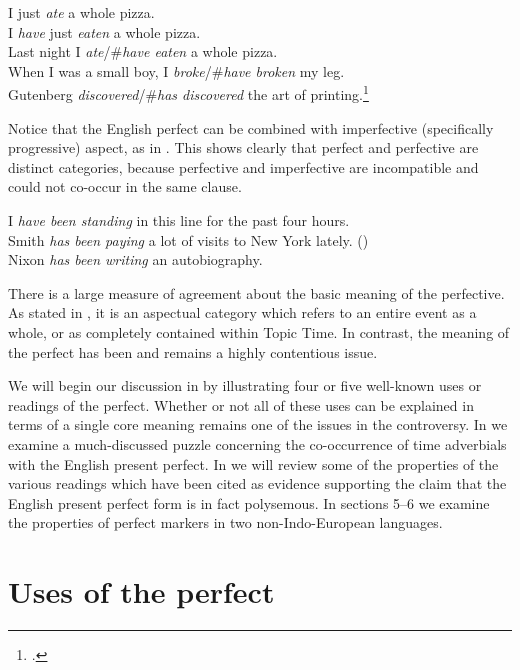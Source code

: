\ea
\ea I just \textit{ate} a whole pizza.\\
\ex I \textit{have} just \textit{eaten} a whole pizza.\\
\ex Last night I \textit{ate}/\#\textit{have eaten} a whole pizza.\\
\ex When I was a small boy, I \textit{broke}/\#\textit{have broken} my leg.\\
\ex Gutenberg \textit{discovered}/\#\textit{has discovered} the art of printing.\footnote{\citet{McCoard1978}.}
                       \z
\z


Notice that the English perfect can be combined with imperfective (specifically progressive) aspect, as in . This shows clearly that perfect and perfective are distinct categories, because perfective and imperfective are incompatible and could not co-occur in the same clause.


\ea
\ea I \textit{have been standing} in this line for the past four hours.\\
\ex Smith \textit{has been paying} a lot of visits to New York lately.  (\citealt{Grice1975})\\
\ex Nixon \textit{has been writing} an autobiography.
                       \z
\z


There is a large measure of agreement about the basic meaning of the perfective. As stated in , it is an aspectual category which refers to an entire event as a whole, or as completely contained within Topic Time. In contrast, the meaning of the perfect has been and remains a highly contentious issue.



We will begin our discussion in  by illustrating four or five well-known uses or readings of the perfect. Whether or not all of these uses can be explained in terms of a single core meaning remains one of the issues in the controversy. In  we examine a much-discussed puzzle concerning the co-occurrence of time adverbials with the English present perfect. In  we will review some of the properties of the various readings which have been cited as evidence supporting the claim that the English present perfect form is in fact polysemous. In sections 5–6 we examine the properties of perfect markers in two non-Indo-European languages.


\section{Uses of the perfect}\label{sec:} %

